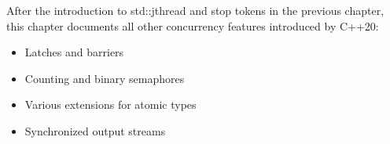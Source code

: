 
After the introduction to std::jthread and stop tokens in the previous chapter, this chapter documents all other concurrency features introduced by C++20:

\begin{itemize}
\item 
Latches and barriers

\item 
Counting and binary semaphores

\item 
Various extensions for atomic types

\item 
Synchronized output streams
\end{itemize}